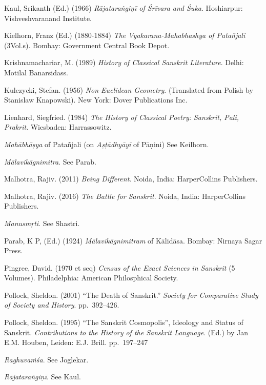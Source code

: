 \begin{thebibliography}{99}
Kaul, Srikanth (Ed.) (1966) {\sl Rājataraṅgiṇī of Śrīvara and Śuka}. Hoshiarpur: Vishveshvaranand Institute.

Kielhorn, Franz (Ed.) (1880-1884) {\sl The Vyakarana-Mahabhashya of Patañjali} (3Vol.s). Bombay: Government Central Book Depot.

Krishnamachariar, M. (1989) {\sl History of Classical Sanskrit Literature}. Delhi: Motilal Banarsidass.

Kulczycki, Stefan. (1956) {\sl Non-Euclidean Geometry}. (Translated from Polish by Stanislaw Knapowski). New York: Dover Publications Inc.

Lienhard, Siegfried. (1984) {\sl The History of Classical Poetry: Sanskrit, Pali, Prakrit}. Wiesbaden: Harrassowitz.

{\sl Mahābhāṣya} of Patañjali (on {\sl Aṣṭādhyāyī} of Pāṇini) See Keilhorn.

{\sl Mālavikāgnimitra}. See Parab. 

Malhotra, Rajiv. (2011) {\sl Being Different}. Noida, India: HarperCollins Publishers.

Malhotra, Rajiv. (2016) {\sl The Battle for Sanskrit}. Noida, India: HarperCollins Publishers.

{\sl Manusmṛti}. See Shastri.

Parab, K P, (Ed.) (1924) {\sl Mālavikāgnimitram} of Kālidāsa. Bombay: Nirnaya Sagar Press.

Pingree, David. (1970 et seq) {\sl Census of the Exact Sciences in Sanskrit} (5 Volumes). Philadelphia: American Philosphical Society.

Pollock, Sheldon. (2001) “The Death of Sanskrit.” {\sl Society for Comparative Study of Society and History}. pp.~392--426.

Pollock, Sheldon. (1995) “The Sanskrit Cosmopolis”, Ideology and Status of Sanskrit. {\sl Contributions to the History of the Sanskrit Language}. (Ed.) by Jan E.M. Houben, Leiden: E.J. Brill. pp.~197--247

{\sl Raghuvaṁśa}. See Joglekar.

{\sl Rājataraṅgiṇī}. See Kaul.


\end{thebibliography}
